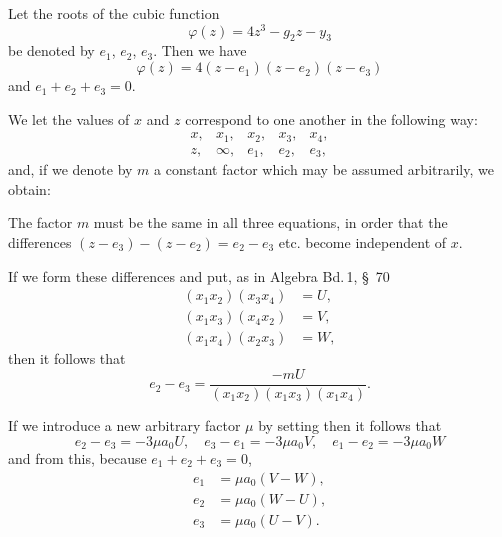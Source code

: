 
Let the roots of the cubic function
\[
\varphi(z) = 4z^3 - g_2 z - y_3 %
\]
be denoted by $e_1$, $e_2$, $e_3$. Then we have
\[
\varphi(z) = 4(z-e_1)(z-e_2)(z-e_3)
\]
and $e_1 + e_2 + e_3 = 0$.

We let the values of $x$ and $z$ correspond to one another in the following way:
\[
\begin{array}{ccccc}
x, & x_1, & x_2, & x_3, & x_4, \\
z, & \infty, & e_1, & e_2, & e_3,
\end{array}
\]
and, if we denote by $m$ a constant factor which may be assumed arbitrarily, we obtain:

The factor $m$ must be the same in all three equations, in order that the differences $(z-e_3)-(z-e_2)=e_2-e_3$ etc. become independent of $x$.

If we form these differences and put, as in Algebra Bd.\,1, \S\ 70
\[
\begin{aligned}
(x_1x_2)(x_3x_4) &= U,\\
(x_1x_3)(x_4x_2) &= V,\\
(x_1x_4)(x_2x_3) &= W,
\end{aligned}
\]
then it follows that
\[
e_2 - e_3 = \frac{-mU}{(x_1x_2)(x_1x_3)(x_1x_4)}.
\]

If we introduce a new arbitrary factor $\mu$ by setting
then it follows that
\[
e_2 - e_3 = -3\mu a_0 U, \quad e_3 - e_1 = -3\mu a_0 V, \quad e_1 - e_2 = -3\mu a_0 W
\]
and from this, because $e_1+e_2+e_3=0$,
\[
\begin{aligned}
e_1 &= \mu a_0 (V-W),\\
e_2 &= \mu a_0 (W-U),\\
e_3 &= \mu a_0 (U-V).
\end{aligned}
\]
